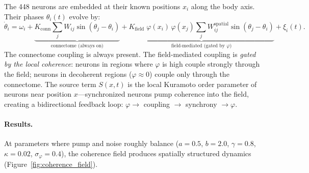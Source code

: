 \documentclass[12pt]{article}
\begin{document}
The 448 neurons are embedded at their known positions $x_i$ along the body axis. Their phases $\theta_i(t)$ evolve by:
\begin{equation}
\dot{\theta}_i = \omega_i + \underbrace{K_{\mathrm{conn}} \sum_j W_{ij} \sin(\theta_j - \theta_i)}_{\text{connectome (always on)}} + \underbrace{K_{\mathrm{field}} \; \varphi(x_i)\,\varphi(x_j) \sum_j W^{\mathrm{spatial}}_{ij} \sin(\theta_j - \theta_i)}_{\text{field-mediated (gated by } \varphi\text{)}} + \xi_i(t).
\end{equation}
The connectome coupling is always present. The field-mediated coupling is \textit{gated by the local coherence}: neurons in regions where $\varphi$ is high couple strongly through the field; neurons in decoherent regions ($\varphi \approx 0$) couple only through the connectome. The source term $S(x,t)$ is the local Kuramoto order parameter of neurons near position $x$---synchronized neurons pump coherence into the field, creating a bidirectional feedback loop: $\varphi \to$ coupling $\to$ synchrony $\to \varphi$.

\paragraph{Results.} At parameters where pump and noise roughly balance ($a = 0.5$, $b = 2.0$, $\gamma = 0.8$, $\kappa = 0.02$, $\sigma_\varphi = 0.4$), the coherence field produces spatially structured dynamics (Figure~\ref{fig:coherence_field}).
\end{document}
